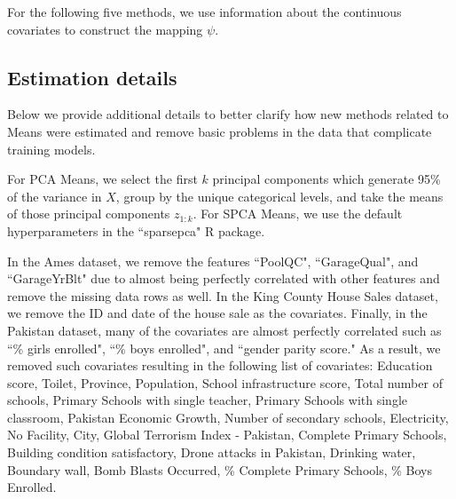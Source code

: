 \documentclass{article}
\theoremstyle{plain}
\theoremstyle{definition}
\theoremstyle{remark}
\begin{document}
For the following five methods, we use information about the continuous covariates to construct the mapping $\psi$.

\subsection{Estimation details}\label{subsec:estim}

Below we provide additional details to better clarify how new methods related to Means were estimated and remove basic problems in the data that complicate training models.

For PCA Means, we select the first $k$ principal components which generate 95\% of the variance in $X$, group by the unique categorical levels, and take the means of those principal components $z_{1:k}$. For SPCA Means, we use the default hyperparameters in the ``sparsepca" R package. %

In the Ames dataset, we remove the features ``PoolQC", ``GarageQual", and ``GarageYrBlt" due to almost being perfectly correlated with other features and remove the missing data rows as well. In the King County House Sales dataset, we remove the ID and date of the house sale as the covariates. Finally, in the Pakistan dataset, many of the covariates are almost perfectly correlated such as ``\% girls enrolled", ``\% boys enrolled", and ``gender parity score." As a result, we removed such covariates resulting in the following list of covariates: Education score, Toilet, Province, Population, School infrastructure score, Total number of schools, Primary Schools with single teacher, Primary Schools with single classroom, Pakistan Economic Growth, Number of secondary schools, Electricity, No Facility, City, Global Terrorism Index - Pakistan, Complete Primary Schools, Building condition satisfactory, Drone attacks in Pakistan, Drinking water, Boundary wall, Bomb Blasts Occurred, \% Complete Primary Schools, \% Boys Enrolled.








\end{document}
